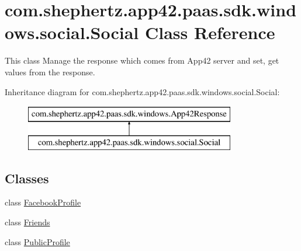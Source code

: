 \hypertarget{classcom_1_1shephertz_1_1app42_1_1paas_1_1sdk_1_1windows_1_1social_1_1_social}{\section{com.\+shephertz.\+app42.\+paas.\+sdk.\+windows.\+social.\+Social Class Reference}
\label{classcom_1_1shephertz_1_1app42_1_1paas_1_1sdk_1_1windows_1_1social_1_1_social}
}


This class Manage the response which comes from App42 server and set, get values from the response.  


Inheritance diagram for com.\+shephertz.\+app42.\+paas.\+sdk.\+windows.\+social.\+Social\+:\begin{figure}[H]
\begin{center}
\leavevmode
\includegraphics[height=2.000000cm]{classcom_1_1shephertz_1_1app42_1_1paas_1_1sdk_1_1windows_1_1social_1_1_social}
\end{center}
\end{figure}
\subsection*{Classes}
\begin{DoxyCompactItemize}
\item 
class \hyperlink{classcom_1_1shephertz_1_1app42_1_1paas_1_1sdk_1_1windows_1_1social_1_1_social_1_1_facebook_profile}{Facebook\+Profile}
\item 
class \hyperlink{classcom_1_1shephertz_1_1app42_1_1paas_1_1sdk_1_1windows_1_1social_1_1_social_1_1_friends}{Friends}
\item 
class \hyperlink{classcom_1_1shephertz_1_1app42_1_1paas_1_1sdk_1_1windows_1_1social_1_1_social_1_1_public_profile}{Public\+Profile}
\end{DoxyCompactItemize}
